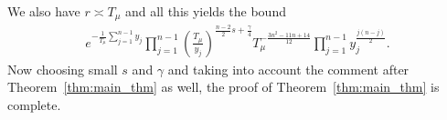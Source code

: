 \documentclass[11pt, oneside]{amsart}
\theoremstyle{plain}
\theoremstyle{remark}
\begin{document}
We also have $r \asymp T_\mu$ and all this yields the bound
\begin{align*}
e^{-\frac{1}{T_\mu}\sum_{j=1}^{n-1} y_j}
\prod_{j=1}^{n-1}\left(\frac{T_\mu}{y_j}\right)^{\frac{n-2}{2}s+\frac{\gamma}{4}}T_\mu^{-\frac{3n^2-11n+14}{12}}
\prod_{j=1}^{n-1}y_j^{\frac{j(n-j)}2}.
\end{align*}
Now choosing small $s$ and $\gamma$ and 
taking into account the comment 
after Theorem~\ref{thm:main_thm} as well,
the proof of Theorem~\ref{thm:main_thm} is complete.



\end{document}
